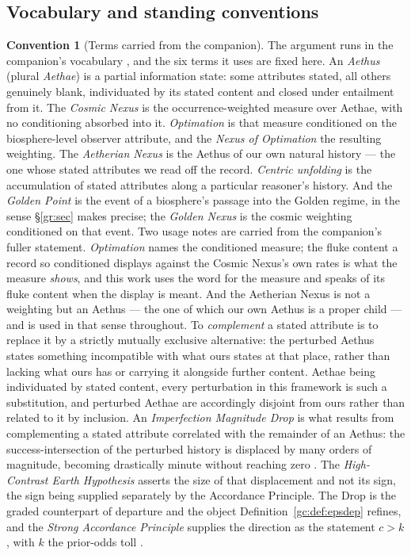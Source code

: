 \documentclass[11pt]{article}
\numberwithin{equation}{section}
\theoremstyle{plain}
\theoremstyle{definition}
\newtheorem{convention}[theorem]{Convention}
\theoremstyle{remark}
\begin{document}
\subsection{Vocabulary and standing conventions}\label{gc:sub:vocab}

\begin{convention}[Terms carried from the companion]\label{gc:conv:vocab}
The argument runs in the companion's vocabulary
\cite{Nexus, Ben26Found}, and the six terms it uses are fixed here.
An \emph{Aethus} (plural \emph{Aethae}) is a partial information state:
some attributes stated, all others genuinely blank, individuated by its
stated content and closed under entailment from it. The \emph{Cosmic
Nexus} is the occurrence-weighted measure over Aethae, with no
conditioning absorbed into it. \emph{Optimation} is that measure
conditioned on the biosphere-level observer attribute, and the
\emph{Nexus of Optimation} the resulting weighting. The
\emph{Aetherian Nexus} is the Aethus of our own natural history ---
the one whose stated attributes we read off the record. \emph{Centric
unfolding} is the accumulation of stated attributes along a
particular reasoner's history. And the \emph{Golden Point} is the event
of a biosphere's passage into the Golden regime, in the sense
\S\ref{gr:sec} makes precise; the \emph{Golden Nexus} is the cosmic
weighting conditioned on that event.
Two usage notes are carried from the companion's fuller statement.
\emph{Optimation} names the conditioned measure; the fluke content a
record so conditioned displays against the Cosmic Nexus's own rates is
what the measure \emph{shows}, and this work uses the word for the
measure and speaks of its fluke content when the display is meant. And
the Aetherian Nexus is not a weighting but an Aethus --- the one of
which our own Aethus is a proper child --- and is used in that sense
throughout.
To \emph{complement} a stated attribute is to replace it by a
strictly mutually exclusive alternative: the perturbed Aethus states
something incompatible with what ours states at that place, rather than
lacking what ours has or carrying it alongside further content. Aethae
being individuated by stated content, every perturbation in this
framework is such a substitution, and perturbed Aethae are accordingly
disjoint from ours rather than related to it by inclusion. An
\emph{Imperfection Magnitude Drop} is what results from complementing a
stated attribute correlated with the remainder of an Aethus: the
success-intersection of the perturbed history is displaced by many
orders of magnitude, becoming drastically minute without reaching zero
\cite[\S IMD]{Nexus}. The \emph{High-Contrast Earth Hypothesis} asserts
the size of that displacement and not its sign, the sign being supplied
separately by the Accordance Principle. The Drop is the graded
counterpart of departure and the object Definition~\ref{gc:def:epsdep}
refines, and the \emph{Strong Accordance Principle} supplies the
direction as the statement $c>k$, with $k$ the prior-odds toll
\cite{Ben26Optimal}.
\end{convention}
\end{document}
